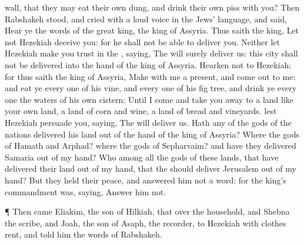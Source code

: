 {wall, that they may
eat their own
dung, and
drink their own
piss with you?
Then
Rabshakeh
stood, and
cried with a
loud
voice in the
Jews’ language, and
said,
Hear ye the
words of the
great
king, the
king of
Assyria.
Thus
saith the
king, Let not
Hezekiah
deceive you: for he shall not be
able to
deliver you.
Neither let
Hezekiah make you
trust in the
{},
saying, The
{} will
surely
deliver us: this
city shall not be
delivered into the
hand of the
king of
Assyria.
Hearken not to
Hezekiah: for thus
saith the
king of
Assyria,
Make
{} with me
{} a
present, and come
out to me: and
eat ye every
one of his
vine, and every
one of his fig
tree, and
drink ye every
one the
waters of his own
cistern;
Until I
come and take you
away to a
land like your own
land, a
land of
corn and
wine, a
land of
bread and
vineyards.
 lest
Hezekiah
persuade you,
saying, The
{} will
deliver us. Hath
any of the
gods of the
nations
delivered his
land out of the
hand of the
king of
Assyria?
Where
{} the
gods of
Hamath and
Arphad? where
{} the
gods of
Sepharvaim? and have they
delivered
Samaria out of my
hand?
Who
{} among all the
gods of these
lands, that have
delivered their
land out of my
hand, that the
{} should
deliver
Jerusalem out of my
hand?
But they held their
peace, and
answered him not a
word: for the
king’s
commandment was,
saying,
Answer him not.
\par }{\PP {}¶ Then
came
Eliakim, the
son of
Hilkiah, that
{} over the
household, and
Shebna the
scribe, and
Joah, the
son of
Asaph, the
recorder, to
Hezekiah with
{}
clothes
rent, and
told him the
words of
Rabshakeh.

}
